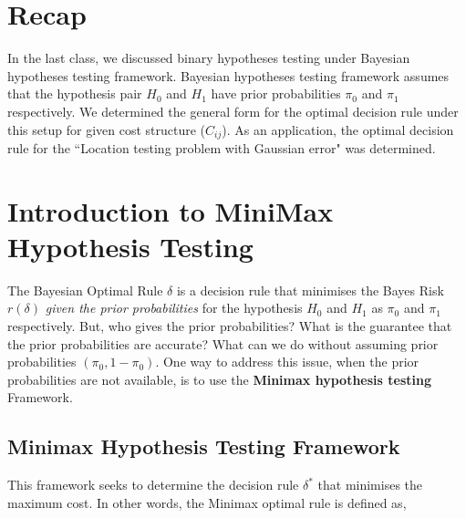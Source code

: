 \documentclass[12pt]{report}
\begin{document}
\maketitle


\section{Recap}

In the last class, we discussed binary hypotheses testing under Bayesian hypotheses testing framework. Bayesian hypotheses testing framework assumes that the hypothesis pair $H_0$ and $H_1$ have prior probabilities $\pi_0$ and $\pi_1$ respectively. We determined the general form for the optimal decision rule under this setup for given cost structure ($C_{ij}$). As an application, the optimal decision rule for the ``Location testing problem with Gaussian error" was determined.


\section{Introduction to MiniMax Hypothesis Testing}

The Bayesian Optimal Rule $\delta$ is a decision rule that minimises the Bayes Risk $r(\delta)$ {\em given the prior probabilities} for the hypothesis $H_0$ and $H_1$ as $\pi_0$ and $\pi_1$ respectively. But, who gives the prior probabilities? What is the guarantee that the prior probabilities are accurate? What can we do without assuming prior probabilities $(\pi_0,1-\pi_0)$. One way to address this issue, when the prior probabilities are not available, is to use the {\bf Minimax hypothesis testing} Framework.

\subsection{Minimax Hypothesis Testing Framework}
This framework seeks to determine the decision rule $\delta^*$ that minimises the maximum cost. In other words, the Minimax optimal rule is defined as,
\end{document}
